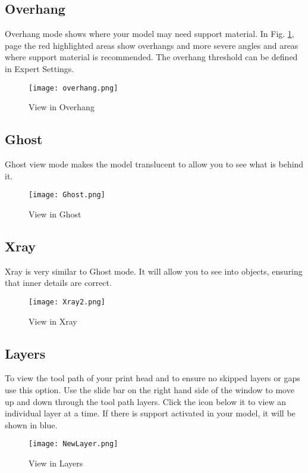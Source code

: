 \subsection{Overhang}
Overhang mode shows where your model may need support material. In Fig. \ref{fig:Overhang_View}, page \pageref{fig:Overhang_View} the red highlighted areas show overhangs and more severe angles and areas where support material is recommended. The overhang threshold can be defined in Expert Settings.
\begin{figure}[H]
\centering
\texttt{[image: overhang.png]}
\caption{View in Overhang}
\label{fig:Overhang_View}
\end{figure}

\subsection{Ghost}
Ghost view mode makes the model translucent to allow you to see what is behind it.
\begin{figure}[H]
\centering
\texttt{[image: Ghost.png]}
\caption{View in Ghost}
\label{fig:Ghost View}
\end{figure}

\subsection{Xray}
Xray is very similar to Ghost mode. It will allow you to see into objects, ensuring that inner details are correct.
\begin{figure}[H]
\centering
\texttt{[image: Xray2.png]}
\caption{View in Xray}
\label{fig:Xray View}
\end{figure}

\subsection{Layers}
To view the tool path of your print head and to ensure no skipped layers or gaps use this option. Use the slide bar on the right hand side of the window to move up and down through the tool path layers. Click the icon below it to view an individual layer at a time. If there is support activated in your model, it will be shown in blue.
\begin{figure}[H]
\centering
\texttt{[image: NewLayer.png]}
\caption{View in Layers}
\label{fig:Layers View}
\end{figure}

